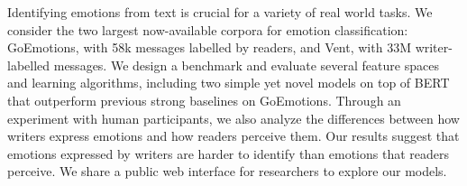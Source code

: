 Identifying emotions from text is crucial for a variety of real world tasks. We consider the two largest now-available corpora for emotion classification: GoEmotions, with 58k messages labelled by readers, and Vent, with 33M writer-labelled messages. We design a benchmark and evaluate several feature spaces and learning algorithms, including two simple yet novel models on top of BERT that outperform previous strong baselines on GoEmotions. Through an experiment with human participants, we also analyze the differences between how writers express emotions and how readers perceive them. Our results suggest that emotions expressed by writers are harder to identify than emotions that readers perceive. We share a public web interface for researchers to explore our models.
